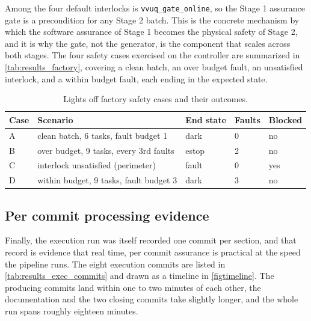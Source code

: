Among the four default interlocks is
\texttt{vvuq\_gate\_online}, so the Stage 1 assurance gate is a precondition for
any Stage 2 batch. This is the concrete mechanism by which the software assurance
of Stage 1 becomes the physical safety of Stage 2, and it is why the gate, not
the generator, is the component that scales across both stages. The four safety
cases exercised on the controller are summarized in
\autoref{tab:results_factory}, covering a clean batch, an over budget fault, an
unsatisfied interlock, and a within budget fault, each ending in the expected
state.

\begin{table}[H]
\caption{Lights off factory safety cases and their outcomes.}
\label{tab:results_factory}
\centering
\begin{tabularx}{\textwidth}{C{1.0cm} L{7.0cm} C{1.9cm} C{2cm} >{\raggedright\arraybackslash}X}
\toprule
\textbf{Case} & \textbf{Scenario} & \textbf{End state} & \textbf{Faults} & \textbf{Blocked} \\
\midrule
  A & clean batch, 6 tasks, fault budget 1 & dark & 0 & no \\
  B & over budget, 9 tasks, every 3rd faults & estop & 2 & no \\
  C & interlock unsatisfied (perimeter) & fault & 0 & yes \\
  D & within budget, 9 tasks, fault budget 3 & dark & 3 & no \\
\bottomrule
\end{tabularx}
\end{table}

\subsection{Per commit processing evidence}

Finally, the execution run was itself recorded one commit per section, and that
record is evidence that real time, per commit assurance is practical at the speed
the pipeline runs. The eight execution commits are listed in
\autoref{tab:results_exec_commits} and drawn as a timeline in
\autoref{figtimeline}. The producing commits land within one to two minutes of
each other, the documentation and the two closing commits take slightly longer,
and the whole run spans roughly eighteen minutes. 

